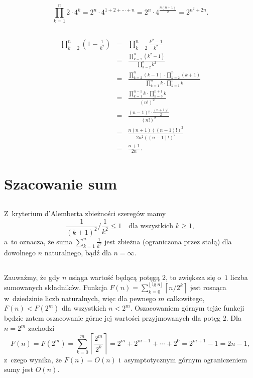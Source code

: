 \subsection{} %
\[
	\prod_{k=1}^n2\cdot 4^k = 2^n\cdot 4^{1+2+\cdots+n} = 2^n\cdot 4^{\frac{n(n+1)}{2}} = 2^{n^2+2n}.
\]

\subsection{} %
\begin{eqnarray*}
	\prod_{k=2}^n\left(1-\frac{1}{k^2}\right) &=& \prod_{k=2}^n\frac{k^2-1}{k^2} \\
	&=& \frac{\prod_{k=2}^n\left(k^2-1\right)}{\prod_{k=2}^nk^2} \\
	&=& \frac{\prod_{k=2}^n(k-1)\cdot\prod_{k=2}^n(k+1)}{\prod_{k=1}^nk\cdot\prod_{k=1}^nk} \\
	&=& \frac{\prod_{k=1}^{n-1}k\cdot\prod_{k=3}^{n+1}k}{(n!)^2} \\
	&=& \frac{(n-1)!\cdot\frac{(n+1)!}{2}}{(n!)^2} \\
	&=& \frac{n(n+1)((n-1)!)^2}{2n^2((n-1)!)^2} \\
	&=& \frac{n+1}{2n}.
\end{eqnarray*}

\section{Szacowanie sum}

\subsection{} %
Z~kryterium d'Alemberta zbieżności szeregów mamy
\[
	\frac{1}{(k+1)^2}\bigg /\frac{1}{k^2}\le 1\quad\mbox{dla wszystkich }k\ge1,
\]
a~to oznacza, że suma $\sum_{k=1}^n\frac{1}{k^2}$ jest zbieżna (ograniczona przez stałą) dla dowolnego $n$ naturalnego, bądź dla $n=\infty$.

\subsection{} %
Zauważmy, że gdy $n$ osiąga wartość będącą potęgą $2$, to zwiększa się o~$1$ liczba sumowanych składników. Funkcja $F(n)=\sum_{k=0}^{\lfloor\lg n\rfloor}\left\lceil n/2^k\right\rceil$ jest rosnąca w~dziedzinie liczb naturalnych, więc dla pewnego $m$ całkowitego, $F(n)<F(2^m)$ dla wszystkich $n<2^m$. Oszacowaniem górnym tejże funkcji będzie zatem oszacowanie górne jej wartości przyjmowanych dla potęg $2$. Dla $n=2^m$ zachodzi
\[
	F(n) = F(2^m) = \sum_{k=0}^m\left\lceil\frac{2^m}{2^k}\right\rceil = 2^m+2^{m-1}+\cdots+2^0 = 2^{m+1}-1 = 2n-1,
\]
z~czego wynika, że $F(n) = O(n)$ i~asymptotycznym górnym ograniczeniem sumy jest $O(n)$.

